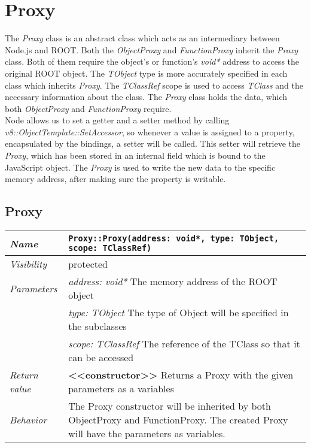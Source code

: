 \chapter{Proxy}
The \textit{Proxy} class is an abstract class which acts as an intermediary between Node.js and ROOT. Both the
\textit{ObjectProxy} and \textit{FunctionProxy} inherit the \textit{Proxy} class. Both of them require the object's or
function's \textit{void*} address to access the original ROOT object. The \textit{TObject} type is more accurately
specified in each class which inherits \textit{Proxy}. The \textit{TClassRef} scope is used to access \textit{TClass}
and the necessary information about the class. The \textit{Proxy} class holds the data, which both
\textit{ObjectProxy} and \textit{FunctionProxy} require.\\

Node allows us to set a getter and a setter method by calling \textit{v8::ObjectTemplate::SetAccessor}, so whenever a value is assigned to a property, encapsulated by the bindings, a setter will be called.
This setter will retrieve the \textit{Proxy}, which has been stored in an internal field which is bound to the JavaScript object. The \textit{Proxy} is used to write the new data to the specific memory address, after making sure the property is writable.

\section{Proxy}
\begin{longtable}{p{3cm} @{\hskip 1cm} p{12cm}}
 \hline
\textit{Name} & \texttt{Proxy::Proxy(address: void*, type: TObject, scope: TClassRef)}\\
\hline
 \textit{Visibility} & protected\\
\hline
\textit{Parameters} & \textit{address: void*} The memory address of the ROOT object \\
& \textit{type: TObject}  The type of Object will be specified in the subclasses \\
& \textit{scope: TClassRef} The reference of the TClass so that it can be accessed  \\
\hline
\textit{Return value} & \textbf{<<constructor>>} Returns a Proxy with the given parameters as a variables \\
  \hline
 \textit{Behavior} & The Proxy constructor will be inherited by both ObjectProxy and FunctionProxy.
 The created Proxy will have the parameters as variables. \\
\hline
\end{longtable}
